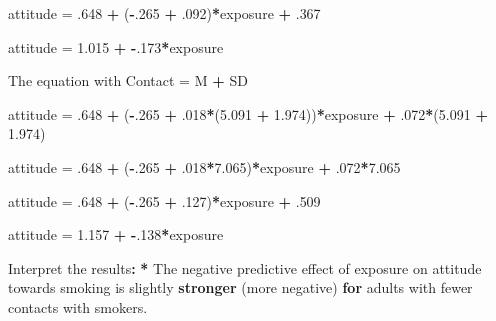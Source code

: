 \documentclass[a4paper]{book}
\newenvironment{Shaded}{\begin{snugshade}}{\end{snugshade}}
\newcommand{\KeywordTok}[1]{\textcolor[rgb]{0,0,0}{\textbf{#1}}}
\newcommand{\DecValTok}[1]{\textcolor[rgb]{0.00,0.00,0.00}{#1}}
\newcommand{\FloatTok}[1]{\textcolor[rgb]{0.00,0.00,0.00}{#1}}
\newcommand{\StringTok}[1]{\textcolor[rgb]{0.00,0.00,0.00}{#1}}
\newcommand{\ControlFlowTok}[1]{\textcolor[rgb]{0.00,0.00,0.00}{\textbf{#1}}}
\newcommand{\OperatorTok}[1]{\textcolor[rgb]{0.00,0.00,0.00}{\textbf{#1}}}
\newcommand{\ErrorTok}[1]{\textcolor[rgb]{0.00,0.00,0.00}{\textbf{#1}}}
\newcommand{\NormalTok}[1]{#1}
\theoremstyle{definition}
\theoremstyle{definition}
\theoremstyle{definition}
\theoremstyle{remark}
\begin{document}
\begin{Shaded}
\begin{Highlighting}[]
\NormalTok{attitude =}\StringTok{ }\NormalTok{.}\DecValTok{648} \OperatorTok{+}\StringTok{ }\NormalTok{(}\OperatorTok{-}\NormalTok{.}\DecValTok{265} \OperatorTok{+}\StringTok{ }\NormalTok{.}\DecValTok{092}\NormalTok{)}\OperatorTok{*}\NormalTok{exposure }\OperatorTok{+}\StringTok{ }\NormalTok{.}\DecValTok{367}  
  
\NormalTok{attitude =}\StringTok{ }\FloatTok{1.015} \OperatorTok{+}\StringTok{ }\OperatorTok{-}\NormalTok{.}\DecValTok{173}\OperatorTok{*}\NormalTok{exposure  }
  
\NormalTok{The equation with Contact =}\StringTok{ }\NormalTok{M }\OperatorTok{+}\StringTok{ }\NormalTok{SD  }
  
\NormalTok{attitude =}\StringTok{ }\NormalTok{.}\DecValTok{648} \OperatorTok{+}\StringTok{ }\NormalTok{(}\OperatorTok{-}\NormalTok{.}\DecValTok{265} \OperatorTok{+}\StringTok{ }\NormalTok{.}\DecValTok{018}\OperatorTok{*}\NormalTok{(}\FloatTok{5.091} \OperatorTok{+}\StringTok{ }\FloatTok{1.974}\NormalTok{))}\OperatorTok{*}\NormalTok{exposure }\OperatorTok{+}\StringTok{ }\NormalTok{.}\DecValTok{072}\OperatorTok{*}\NormalTok{(}\FloatTok{5.091} \OperatorTok{+}\StringTok{ }\FloatTok{1.974}\NormalTok{)  }
  
\NormalTok{attitude =}\StringTok{ }\NormalTok{.}\DecValTok{648} \OperatorTok{+}\StringTok{ }\NormalTok{(}\OperatorTok{-}\NormalTok{.}\DecValTok{265} \OperatorTok{+}\StringTok{ }\NormalTok{.}\DecValTok{018}\OperatorTok{*}\FloatTok{7.065}\NormalTok{)}\OperatorTok{*}\NormalTok{exposure }\OperatorTok{+}\StringTok{ }\NormalTok{.}\DecValTok{072}\OperatorTok{*}\FloatTok{7.065}  
  
\NormalTok{attitude =}\StringTok{ }\NormalTok{.}\DecValTok{648} \OperatorTok{+}\StringTok{ }\NormalTok{(}\OperatorTok{-}\NormalTok{.}\DecValTok{265} \OperatorTok{+}\StringTok{ }\NormalTok{.}\DecValTok{127}\NormalTok{)}\OperatorTok{*}\NormalTok{exposure }\OperatorTok{+}\StringTok{ }\NormalTok{.}\DecValTok{509}  
  
\NormalTok{attitude =}\StringTok{ }\FloatTok{1.157} \OperatorTok{+}\StringTok{ }\OperatorTok{-}\NormalTok{.}\DecValTok{138}\OperatorTok{*}\NormalTok{exposure  }
  
\NormalTok{Interpret the results}\OperatorTok{:}\StringTok{  }
\StringTok{    }
\ErrorTok{*}\StringTok{ }\NormalTok{The negative predictive effect of exposure on attitude towards smoking is}
\NormalTok{slightly }\KeywordTok{stronger}\NormalTok{ (more negative) }\ControlFlowTok{for}\NormalTok{ adults with fewer contacts with smokers.}
\end{Highlighting}
\end{Shaded}
\end{document}
